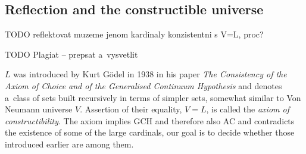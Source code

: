 \documentclass[12pt,a4paper]{article}
\begin{document}

\subsection{Reflection and the constructible universe}


TODO reflektovat muzeme jenom kardinaly konzistentni s V=L, proc?

TODO Plagiat -- prepsat a~vysvetlit

$L$ was introduced by Kurt Gödel in 1938 in his paper \emph{The Consistency of the Axiom of Choice and of the Generalised Continuum Hypothesis} and denotes a~class of sets built recursively in terms of simpler sets, somewhat similar to Von Neumann universe $V$. Assertion of their equality, $V=L$, is called the \emph{axiom of constructibility}. The axiom implies GCH and therefore also AC and contradicts the existence of some of the large cardinals, our goal is to decide whether those introduced earlier are among them.
\end{document}
